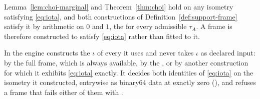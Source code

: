 
Lemma~\ref{lem:choi-marginal} and Theorem~\ref{thm:choi} hold on any
isometry satisfying \eqref{eq:iota}, and both constructions of
Definition~\ref{def:support-frame} satisfy it by arithmetic on $0$ and $1$,
the  for every admissible $\tau_A$. A frame is therefore
constructed to satisfy \eqref{eq:iota} rather than fitted to it.

\begin{requirement}\label{req:frame-constructed}
In  the engine constructs the
 $\iota$ of every  it uses and
never takes $\iota$ as declared input:
by the full frame, which is always available, by the
, or by another construction for which it exhibits
\eqref{eq:iota} exactly. It decides both identities of \eqref{eq:iota} on
the isometry it constructed, entrywise as binary64 data at exactly zero
(), and refuses a frame that fails either of them
with .
\end{requirement}
